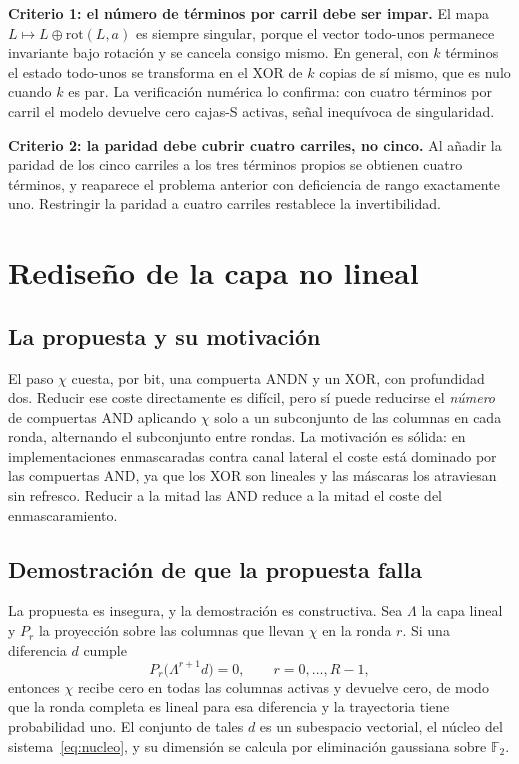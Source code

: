 \documentclass[conference]{IEEEtran}
\newcommand{\Fdos}{\mathbb{F}_2}
\newcommand{\xor}{\oplus}
\begin{document}
\textbf{Criterio 1: el número de términos por carril debe ser impar.} El mapa
$L \mapsto L \xor \mathrm{rot}(L,a)$ es siempre singular, porque el vector
todo-unos permanece invariante bajo rotación y se cancela consigo mismo. En
general, con $k$ términos el estado todo-unos se transforma en el XOR de $k$
copias de sí mismo, que es nulo cuando $k$ es par. La verificación numérica lo
confirma: con cuatro términos por carril el modelo devuelve cero cajas-S activas,
señal inequívoca de singularidad.

\textbf{Criterio 2: la paridad debe cubrir cuatro carriles, no cinco.} Al añadir
la paridad de los cinco carriles a los tres términos propios se obtienen cuatro
términos, y reaparece el problema anterior con deficiencia de rango exactamente
uno. Restringir la paridad a cuatro carriles restablece la invertibilidad.

\section{Rediseño de la capa no lineal}

\subsection{La propuesta y su motivación}

El paso $\chi$ cuesta, por bit, una compuerta ANDN y un XOR, con profundidad dos.
Reducir ese coste directamente es difícil, pero sí puede reducirse el
\emph{número} de compuertas AND aplicando $\chi$ solo a un subconjunto de las
columnas en cada ronda, alternando el subconjunto entre rondas. La motivación es
sólida: en implementaciones enmascaradas contra canal lateral el coste está
dominado por las compuertas AND, ya que los XOR son lineales y las máscaras los
atraviesan sin refresco. Reducir a la mitad las AND reduce a la mitad el coste del
enmascaramiento.

\subsection{Demostración de que la propuesta falla}

La propuesta es insegura, y la demostración es constructiva. Sea $\Lambda$ la capa
lineal y $P_r$ la proyección sobre las columnas que llevan $\chi$ en la ronda $r$.
Si una diferencia $d$ cumple
\begin{equation}\label{eq:nucleo}
P_r\bigl(\Lambda^{r+1} d\bigr) = 0, \qquad r = 0,\dots,R-1,
\end{equation}
entonces $\chi$ recibe cero en todas las columnas activas y devuelve cero, de modo
que la ronda completa es lineal para esa diferencia y la trayectoria tiene
probabilidad uno. El conjunto de tales $d$ es un subespacio vectorial, el núcleo
del sistema~\eqref{eq:nucleo}, y su dimensión se calcula por eliminación gaussiana
sobre $\Fdos$.
\end{document}

